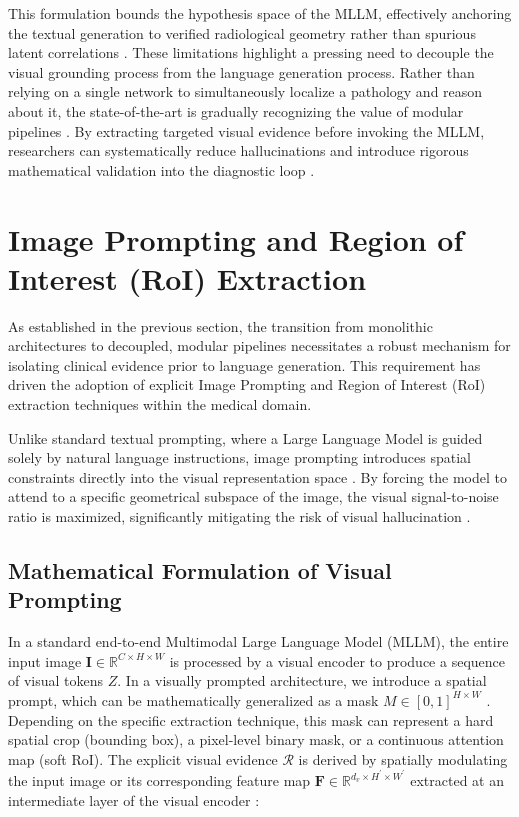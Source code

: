 This formulation bounds the hypothesis space of the MLLM, effectively anchoring the textual generation to verified radiological geometry rather than spurious latent correlations \cite{gupta2023visprog}. These limitations highlight a pressing need to decouple the visual grounding process from the language generation process. Rather than relying on a single network to simultaneously localize a pathology and reason about it, the state-of-the-art is gradually recognizing the value of modular pipelines \cite{lu2023chameleon}. By extracting targeted visual evidence before invoking the MLLM, researchers can systematically reduce hallucinations and introduce rigorous mathematical validation into the diagnostic loop \cite{yang2024modular-med-mllm}.

\section{Image Prompting and Region of Interest (RoI) Extraction}

As established in the previous section, the transition from monolithic architectures to decoupled, modular pipelines necessitates a robust mechanism for isolating clinical evidence prior to language generation. This requirement has driven the adoption of explicit Image Prompting and Region of Interest (RoI) extraction techniques within the medical domain.

Unlike standard textual prompting, where a Large Language Model is guided solely by natural language instructions, image prompting introduces spatial constraints directly into the visual representation space \cite{bahng2022visual-prompting}. By forcing the model to attend to a specific geometrical subspace of the image, the visual signal-to-noise ratio is maximized, significantly mitigating the risk of visual hallucination \cite{shtedritski2023what-is-prompt}.

\subsection{Mathematical Formulation of Visual Prompting}

In a standard end-to-end Multimodal Large Language Model (MLLM), the entire input image $\mathbf{I}\in\mathbb{R}^{C\times H\times W}$ is processed by a visual encoder to produce a sequence of visual tokens $Z$. In a visually prompted architecture, we introduce a spatial prompt, which can be mathematically generalized as a mask $M\in[0,1]^{H\times W}$ \cite{wu2023visual-clues}.
Depending on the specific extraction technique, this mask can represent a hard spatial crop (bounding box), a pixel-level binary mask, or a continuous attention map (soft RoI). The explicit visual evidence $\mathcal{R}$ is derived by spatially modulating the input image or its corresponding feature map $\mathbf{F}\in\mathbb{R}^{d_{v}\times H^{\prime}\times W^{\prime}}$ extracted at an intermediate layer of the visual encoder \cite{zou2024seem}:

